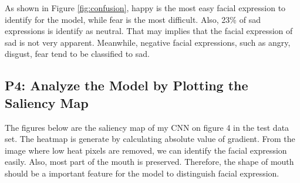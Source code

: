 \documentclass[fleqn,a4paper,12pt]{article}
\begin{document}
As shown in Figure \ref{fig:confusion}, happy is the most easy facial expression to identify for the model, while fear is the most difficult. Also, 23\% of sad expressions is identify as neutral. That may implies that the facial expression of sad is not very apparent. Meanwhile, negative facial expressions, such as angry, disgust, fear tend to be classified to sad.

\subsection*{P4: Analyze the Model by Plotting the Saliency Map}

The figures below are the saliency map of my CNN on figure 4 in the test data set. The heatmap is generate by calculating absolute value of gradient. From the image where low heat pixels are removed, we can identify the facial expression easily. Also, most part of the mouth is preserved. Therefore, the shape of mouth should be a important feature for the model to distinguish facial expression.
\end{document}

